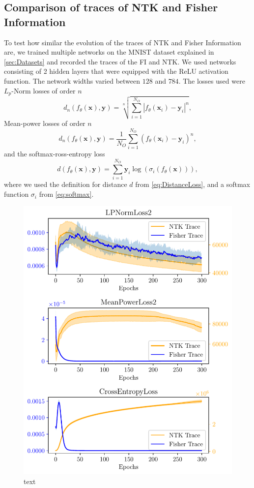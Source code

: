 \subsection{Comparison of traces of NTK and Fisher Information}
To test how similar the evolution of the traces of NTK and Fisher Information are, we trained multiple networks on the MNIST dataset explained in \cref{sec:Datasets} and recorded the traces of the FI and NTK. We used networks consisting of 2 hidden layers that were equipped with the ReLU activation function. The network widths varied between $128$ and $784$. The losses used were $L_p$-Norm losses of order $n$ \cite{LpNormSource}
\begin{equation}
	d_n(f_\theta(\mathbf{x}),\mathbf{y}) = \sqrt[n]{\sum_{i=1}^{N_O} |f_\theta(\mathbf{x}_i) - \mathbf{y}_i|^n},
\end{equation}
Mean-power losses of order $n$
\begin{equation}
	d_n(f_\theta(\mathbf{x}),\mathbf{y}) = \frac{1}{N_O} \sum_{i=1}^{N_O} (f_\theta(\mathbf{x}_i)-\mathbf{y}_i)^n,
\end{equation}
and the softmax-ross-entropy loss \cite{LossExamplePaper}
\begin{equation}
	d(f_\theta(\mathbf{x}),\mathbf{y}) = \sum_{i=1}^{N_O} \mathbf{y}_i \log(\sigma_i(f_\theta(\mathbf{x}))),
\end{equation}
where we used the definition for distance $d$ from \cref{eq:DistanceLoss}, and a softmax function $\sigma_i$ from \cref{eq:softmax}.
\begin{figure}
	\centering
	\includegraphics{text/results/FisherNTKComparisonPlots/Triple_comparison_losses2_128.pdf}
	\caption{text}
\end{figure}